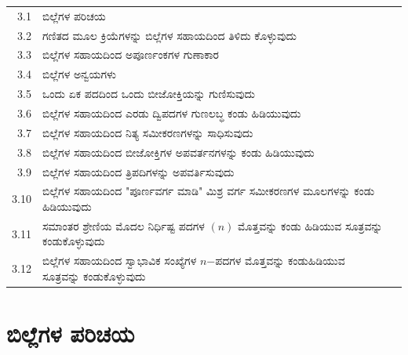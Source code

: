 \medskip
\medskip

{\renewcommand{\arraystretch}{1.2}
\begin{longtable}[l]{@{}>{}r>{\raggedright}p{9.1cm}>{}r@{}}
\hline
3.1 & ಬಿಲ್ಲೆಗಳ ಪರಿಚಯ \dotfill & \pageref{sec3.1}\\
3.2 & ಗಣಿತದ ಮೂಲ ಕ್ರಿಯೆಗಳನ್ನು ಬಿಲ್ಲೆಗಳ ಸಹಾಯದಿಂದ ತಿಳಿದು ಕೊಳ್ಳುವುದು \dotfill & \raisebox{-0.55cm}{\pageref{sec3.2}}\\
3.3 & ಬಿಲ್ಲೆಗಳ ಸಹಾಯದಿಂದ ಅಪೂರ್ಣಂಕಗಳ ಗುಣಾಕಾರ \dotfill & \pageref{sec3.3}\\
3.4 & ಬಿಲ್ಲೆಗಳ ಅನ್ವಯಗಳು \dotfill  & \pageref{sec3.4}\\
3.5 & ಒಂದು ಏಕ ಪದದಿಂದ ಒಂದು ಬೀಜೋಕ್ತಿಯನ್ನು ಗುಣಿಸುವುದು \dotfill & \pageref{sec3.5}\\
3.6 & ಬಿಲ್ಲೆಗಳ ಸಹಾಯದಿಂದ ಎರಡು ದ್ವಿಪದಗಳ ಗುಣಲಬ್ಧ ಕಂಡು ಹಿಡಿಯುವುದು  \dotfill & \raisebox{-0.55cm}{\pageref{sec3.6}}\\
3.7 & ಬಿಲ್ಲೆಗಳ ಸಹಾಯದಿಂದ ನಿತ್ಯ ಸಮೀಕರಣಗಳನ್ನು ಸಾಧಿಸುವುದು  \dotfill & \pageref{sec3.7}\\
3.8 & ಬಿಲ್ಲೆಗಳ ಸಹಾಯದಿಂದ ಬೀಜೋಕ್ತಿಗಳ ಅಪವರ್ತನಗಳನ್ನು ಕಂಡು ಹಿಡಿಯುವುದು \dotfill & \raisebox{-0.55cm}{\pageref{sec3.8}}\\
3.9 & ಬಿಲ್ಲೆಗಳ ಸಹಾಯದಿಂದ ತ್ರಿಪದಿಗಳನ್ನು ಅಪವರ್ತಿಸುವುದು \dotfill & \pageref{sec3.9}\\
3.10 & ಬಿಲ್ಲೆಗಳ ಸಹಾಯದಿಂದ "ಪೂರ್ಣವರ್ಗ ಮಾಡಿ" ಮಿಶ್ರ ವರ್ಗ ಸಮೀಕರಣಗಳ ಮೂಲಗಳನ್ನು ಕಂಡು ಹಿಡಿಯುವುದು \dotfill & \raisebox{-0.55cm}{\pageref{sec3.10}}\\
3.11 &  ಸಮಾಂತರ ಶ್ರೇಣಿಯ ಮೊದಲ ನಿರ್ಧಿಷ್ಟ ಪದಗಳ $(n)$ ಮೊತ್ತವನ್ನು ಕಂಡು ಹಿಡಿಯುವ ಸೂತ್ರವನ್ನು ಕಂಡುಕೊಳ್ಳುವುದು \dotfill & \raisebox{-0.55cm}{\pageref{sec3.11}}\\
3.12 & ಬಿಲ್ಲೆಗಳ ಸಹಾಯದಿಂದ ಸ್ವಾಭಾವಿಕ ಸಂಖ್ಯೆಗಳ $n$$-$ಪದಗಳ ಮೊತ್ತವನ್ನು ಕಂಡುಹಿಡಿಯುವ ಸೂತ್ರವನ್ನು ಕಂಡುಕೊಳ್ಳುವುದು \dotfill & \raisebox{-0.55cm}{\pageref{sec3.12}}\\[0.5cm]
\hline
\end{longtable}}\relax

\bigskip

\section{ಬಿಲ್ಲೆಗಳ ಪರಿಚಯ}\label{sec3.1}%

